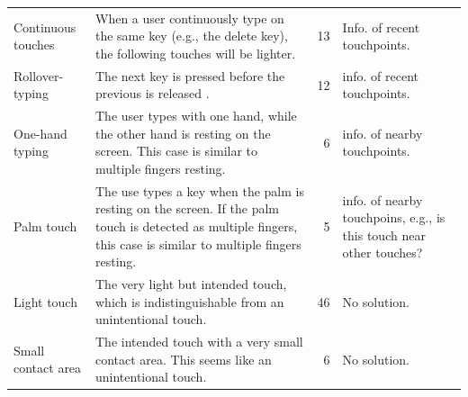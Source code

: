 \begin{table}[htbp]
\begin{tabular}{|p{8.5em}|p{21em}|r|p{10.5em}|}
    \midrule
    \rowcolor[rgb]{ 1,  .902,  .6} \multicolumn{4}{|l|}{\textbf{False Negatives}} \\
    \midrule
    Continuous touches & When a user continuously type on the same key (e.g., the delete key), the following touches will be lighter. & 13    & Info. of recent touchpoints. \\
    \midrule
    Rollover-typing & The next key is pressed before the previous is released \cite{2018-Observations}. & 12    & info. of recent touchpoints. \\
    \midrule
    One-hand typing & The user types with one hand, while the other hand is resting on the screen. This case is similar to multiple fingers resting. & 6     & info. of nearby touchpoints. \\
    \midrule
    Palm touch & The use types a key when the palm is resting on the screen. If the palm touch is detected as multiple fingers, this case is similar to multiple fingers resting. & 5     & info. of nearby touchpoins, e.g., is this touch near other touches? \\
    \midrule
    \rowcolor[rgb]{ .949,  .949,  .949} Light touch & The very light but intended touch, which is indistinguishable from an unintentional touch. & 46    & No solution. \\
    \midrule
    \rowcolor[rgb]{ .949,  .949,  .949} Small contact area & The intended touch with a very small contact area. This seems like an unintentional touch. & 6     & No solution. \\
    \bottomrule
    \end{tabular}%
  \label{tab:fail_cases}%
\end{table}%



